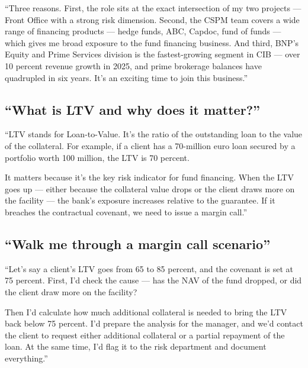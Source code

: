 \documentclass[11pt,a4paper]{article}
\begin{document}
\begin{verbatimbox}
``Three reasons. First, the role sits at the exact intersection of my
two projects --- Front Office with a strong risk dimension. Second,
the CSPM team covers a wide range of financing products --- hedge funds,
ABC, Capdoc, fund of funds --- which gives me broad exposure to the
fund financing business. And third, BNP's Equity and Prime Services
division is the fastest-growing segment in CIB --- over 10 percent
revenue growth in 2025, and prime brokerage balances have quadrupled
in six years. It's an exciting time to join this business.''
\end{verbatimbox}

\subsection{``What is LTV and why does it matter?''}

\begin{verbatimbox}
``LTV stands for Loan-to-Value. It's the ratio of the outstanding loan
to the value of the collateral. For example, if a client has a 70-million
euro loan secured by a portfolio worth 100 million, the LTV is 70 percent.

It matters because it's the key risk indicator for fund financing. When
the LTV goes up --- either because the collateral value drops or the client
draws more on the facility --- the bank's exposure increases relative to the
guarantee. If it breaches the contractual covenant, we need to issue a
margin call.''
\end{verbatimbox}

\subsection{``Walk me through a margin call scenario''}

\begin{verbatimbox}
``Let's say a client's LTV goes from 65 to 85 percent, and the covenant
is set at 75 percent. First, I'd check the cause --- has the NAV of the
fund dropped, or did the client draw more on the facility?

Then I'd calculate how much additional collateral is needed to bring the
LTV back below 75 percent. I'd prepare the analysis for the manager, and
we'd contact the client to request either additional collateral or a
partial repayment of the loan. At the same time, I'd flag it to the
risk department and document everything.''
\end{verbatimbox}
\end{document}
